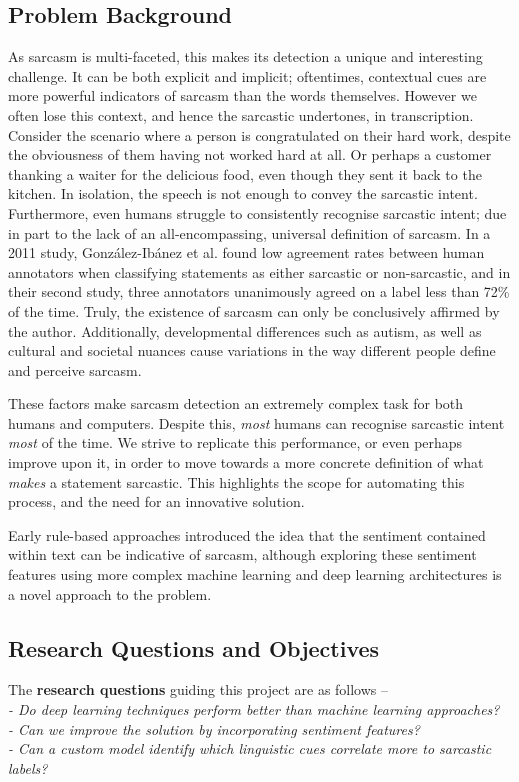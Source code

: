 \documentclass[12pt,a4paper]{article}
\begin{document}
\subsection{Problem Background}
\noindent As sarcasm is multi-faceted, this makes its detection a unique and interesting challenge. It can be both explicit and implicit; oftentimes, contextual cues are more powerful indicators of sarcasm than the words themselves. However we often lose this context, and hence the sarcastic undertones, in transcription. Consider the scenario where a person is congratulated on their hard work, despite the obviousness of them having not worked hard at all. Or perhaps a customer thanking a waiter for the delicious food, even though they sent it back to the kitchen. In isolation, the speech is not enough to convey the sarcastic intent. Furthermore, even humans struggle to consistently recognise sarcastic intent; due in part to the lack of an all-encompassing, universal definition of sarcasm. In a 2011 study, Gonz{\'a}lez-Ib{\'a}nez et al. \cite{gonzalez2011identifying} found low agreement rates between human annotators when classifying statements as either sarcastic or non-sarcastic, and in their second study, three annotators unanimously agreed on a label less than 72\% of the time. Truly, the existence of sarcasm can only be conclusively affirmed by the author. Additionally, developmental differences such as autism, as well as cultural and societal nuances cause variations in the way different people define and perceive sarcasm.

These factors make sarcasm detection an extremely complex task for both humans and computers. Despite this, \textit{most} humans can recognise sarcastic intent \textit{most} of the time. We strive to replicate this performance, or even perhaps improve upon it, in order to move towards a more concrete definition of what \textit{makes} a statement sarcastic. This highlights the scope for automating this process, and the need for an innovative solution.

Early rule-based approaches introduced the idea that the sentiment contained within text can be indicative of sarcasm, although exploring these sentiment features using more complex machine learning and deep learning architectures is a novel approach to the problem.

\subsection{Research Questions and Objectives}
\noindent The \textbf{research questions} guiding this project are as follows --\\
\indent \textit{- Do deep learning techniques perform better than machine learning approaches?}\\ 
\indent \textit{- Can we improve the solution by incorporating sentiment features?}\\ 
\indent \textit{- Can a custom model identify which linguistic cues correlate more to sarcastic labels?}\\
\end{document}
